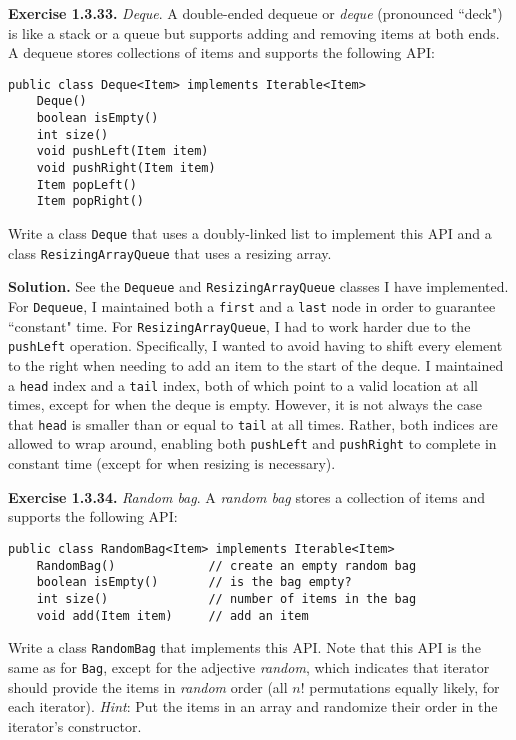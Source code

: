 \documentclass[12pt, a4paper]{article}
\newenvironment{ex}[2][Exercise]
{\par\medskip\noindent \textbf{#1 #2.}}
{\medskip}
\newenvironment{sol}[1][Solution]
{\par\medskip\noindent \textbf{#1.} }
{\medskip}
\begin{document}
	\begin{ex}{1.3.33}
		\emph{Deque}. A double-ended dequeue or \emph{deque} (pronounced ``deck") is
		like a stack or a queue but supports adding and removing items at both ends.
		A dequeue stores collections of items and supports the following API:
		\begin{lstlisting}[language={}]
public class Deque<Item> implements Iterable<Item>
	Deque()
	boolean isEmpty()
	int size()
	void pushLeft(Item item)
	void pushRight(Item item)
	Item popLeft()
	Item popRight()
		\end{lstlisting}
		Write a class \texttt{Deque} that uses a doubly-linked list to implement this API
		and a class \texttt{ResizingArrayQueue} that uses a resizing array.
	\end{ex}
	\begin{sol}
		See the \texttt{Dequeue} and \texttt{ResizingArrayQueue} classes I have implemented.
		For \texttt{Dequeue}, I maintained both a \texttt{first} and a \texttt{last} node
		in order to guarantee ``constant" time. For \texttt{ResizingArrayQueue}, I had
		to work harder due to the \texttt{pushLeft} operation. Specifically, I wanted to
		avoid having to shift every element to the right when needing to add an item to
		the start of the deque. I maintained a \texttt{head} index and a \texttt{tail}
		index, both of which point to a valid location at all times, except for when
		the deque is empty. However, it is not always the case that \texttt{head} is
		smaller than or equal to \texttt{tail} at all times. Rather, both indices
		are allowed to wrap around, enabling both \texttt{pushLeft} and \texttt{pushRight}
		to complete in constant time (except for when resizing is necessary).
	\end{sol}
	\begin{ex}{1.3.34}
		\emph{Random bag}. A \emph{random bag} stores a collection of items and supports
		the following API:
		\begin{lstlisting}[language={}]
public class RandomBag<Item> implements Iterable<Item>
	RandomBag()				// create an empty random bag
	boolean isEmpty()		// is the bag empty?
	int size()				// number of items in the bag
	void add(Item item)		// add an item
		\end{lstlisting}
		Write a class \texttt{RandomBag} that implements this API. Note that this API is the
		same as for \texttt{Bag}, except for the adjective \emph{random}, which indicates that
		iterator should provide the items in \emph{random} order (all $n!$ permutations equally
		likely, for each iterator). \emph{Hint}: Put the items in an array and randomize their
		order in the iterator's constructor.
	\end{ex}
\end{document}
